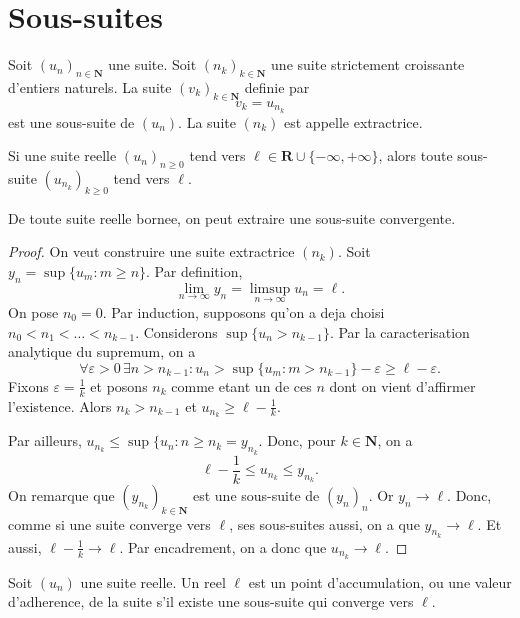 \section{Sous-suites}
\begin{definition}
Soit $(u_{n})_{n\in \mathbf{N}}$ une suite. Soit $(n_{k})_{k\in \mathbf{N}}$ une suite strictement croissante d'entiers naturels. La suite $(v_{k})_{k\in \mathbf{N}}$ definie par 
$$
v_{k}=u_{n_{k}}
$$
est une sous-suite de $(u_{n})$. La suite $(n_{k})$ est appelle extractrice.
\end{definition}
\begin{proposition}
Si une suite reelle $(u_{n})_{n\ge 0}$ tend vers $\ell \in \mathbf{R}\cup \{ -\infty,+\infty \}$, alors toute sous-suite $(u_{n_{k}})_{k\ge 0}$ tend vers $\ell$.
\end{proposition}
\begin{theorem}
De toute suite reelle bornee, on peut extraire une sous-suite convergente.
\end{theorem}
\begin{proof}
On veut construire une suite extractrice $(n_{k})$. Soit $y_{n}=\sup \{ u_{m}:m\ge n \}$. Par definition, 
$$
\lim_{ n \to \infty } y_{n}=\limsup_{ n \to \infty } u_{n}=\ell.
$$
On pose $n_{0}=0$. Par induction, supposons qu'on a deja choisi $n_{0}< n_{1}<\dots<n_{k-1}$. Considerons $\sup \{ u_{n}>n_{k-1} \}$. Par la caracterisation analytique du supremum, on a 
$$
\forall\varepsilon>0\,\exists n>n_{k-1}:u_{n}>\sup \{ u_{m}:m>n_{k-1} \}-\varepsilon \ge \ell -\varepsilon.
$$
Fixons $\varepsilon=\frac{1}{k}$ et posons $n_{k}$ comme etant un de ces $n$ dont on vient d'affirmer l'existence. Alors $n_{k}>n_{k-1}$ et $u_{n_{k}}\ge \ell -\frac{1}{k}$. 

Par ailleurs, $u_{n_{k}}\le \sup \{ u_{n}:n\ge n_{k}=y_{n_{k}}$. Donc, pour $k\in \mathbf{N}$, on a 
$$
\ell -\frac{1}{k}\le u_{n_{k}}\le y_{n_{k}}.
$$
On remarque que $(y_{n_{k}})_{k\in \mathbf{N}}$ est une sous-suite de $(y_{n})_{n}$. Or $y_{n}\to \ell$. Donc, comme si une suite converge vers $\ell$, ses sous-suites aussi, on a que $y_{n_{k}}\to \ell$. Et aussi, $\ell -\frac{1}{k}\to \ell$. Par encadrement, on a donc que $u_{n_{k}}\to \ell$.
\end{proof}
\begin{definition}
	Soit $(u_{n})$ une suite reelle. Un reel $\ell$ est un point d'accumulation, ou une valeur d'adherence, de la suite s'il existe une sous-suite qui converge vers $\ell$.
\end{definition}
